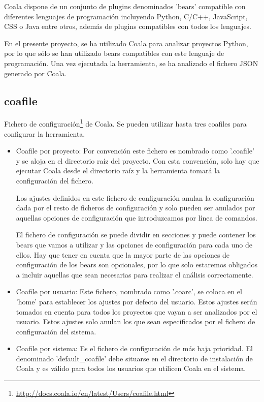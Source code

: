\documentclass[a4paper, 12pt]{book}
\begin{document}
Coala dispone de un conjunto de plugins denominados 'bears' compatible con diferentes lenguajes de programación incluyendo Python, C/C++, JavaScript, CSS o Java entre otros, además de plugins compatibles con todos los lenguajes.

En el presente proyecto, se ha utilizado Coala para analizar proyectos Python, por lo que sólo se han utilizado bears compatibles con este lenguaje de programación. Una vez ejecutada la herramienta, se ha analizado el fichero JSON generado por Coala.

\subsection{coafile}
\label{sec:seccion1.1}
Fichero de configuración\footnote{\url{http://docs.coala.io/en/latest/Users/coafile.html}} de Coala. Se pueden utilizar hasta tres coafiles para configurar la herramienta. 

\begin{itemize}
  \item Coafile por proyecto: Por convención este fichero es nombrado como '.coafile' y se aloja en  el directorio raíz del proyecto. Con esta convención, solo hay que ejecutar Coala desde el directorio raíz y la herramienta tomará la configuración del fichero.

Los ajustes definidos en este fichero de configuración anulan la configuración dada por el resto de ficheros de configuración y solo pueden ser anulados por aquellas opciones de configuración que introduzcamos por línea de comandos.

El fichero de configuración se puede dividir en secciones y puede contener los bears que vamos a utilizar y las opciones de configuración para cada uno de ellos. Hay que tener en cuenta que la mayor parte de las opciones de configuración de los bears son opcionales, por lo que solo estaremos obligados a incluir aquellas que sean necesarias para realizar el análisis correctamente.
  \item Coafile por usuario: Este fichero, nombrado como '.coarc', se coloca en el 'home' para establecer los ajustes por defecto del usuario. Estos ajustes serán tomados en cuenta para todos los proyectos que vayan a ser analizados por el usuario. Estos ajustes solo anulan los que sean especificados por el fichero de configuración del sistema.
  \item Coafile por sistema: Es el fichero de configuración de más baja prioridad. El denominado 'default\_coafile' debe situarse en el directorio de instalación de Coala y es válido para todos los usuarios que utilicen Coala en el sistema.
\end{itemize}
\end{document}
